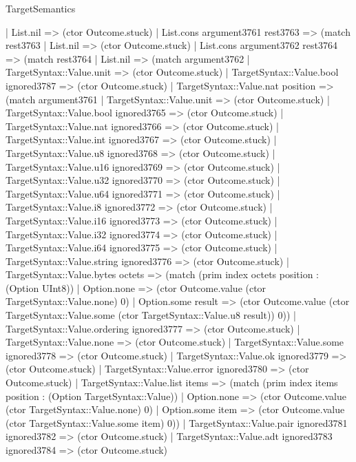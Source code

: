 \begin{lexlean}{TargetSemantics}
\begin{semanticmodule}
{      | List.nil => (ctor Outcome.stuck)
      | List.cons argument3761 rest3763 => (match rest3763
        | List.nil => (ctor Outcome.stuck)
        | List.cons argument3762 rest3764 => (match rest3764
          | List.nil => (match argument3762
            | TargetSyntax::Value.unit => (ctor Outcome.stuck)
            | TargetSyntax::Value.bool ignored3787 => (ctor Outcome.stuck)
            | TargetSyntax::Value.nat position => (match argument3761
              | TargetSyntax::Value.unit => (ctor Outcome.stuck)
              | TargetSyntax::Value.bool ignored3765 => (ctor Outcome.stuck)
              | TargetSyntax::Value.nat ignored3766 => (ctor Outcome.stuck)
              | TargetSyntax::Value.int ignored3767 => (ctor Outcome.stuck)
              | TargetSyntax::Value.u8 ignored3768 => (ctor Outcome.stuck)
              | TargetSyntax::Value.u16 ignored3769 => (ctor Outcome.stuck)
              | TargetSyntax::Value.u32 ignored3770 => (ctor Outcome.stuck)
              | TargetSyntax::Value.u64 ignored3771 => (ctor Outcome.stuck)
              | TargetSyntax::Value.i8 ignored3772 => (ctor Outcome.stuck)
              | TargetSyntax::Value.i16 ignored3773 => (ctor Outcome.stuck)
              | TargetSyntax::Value.i32 ignored3774 => (ctor Outcome.stuck)
              | TargetSyntax::Value.i64 ignored3775 => (ctor Outcome.stuck)
              | TargetSyntax::Value.string ignored3776 => (ctor Outcome.stuck)
              | TargetSyntax::Value.bytes octets => (match (prim index octets position : (Option UInt8))
                | Option.none => (ctor Outcome.value (ctor TargetSyntax::Value.none) 0)
                | Option.some result => (ctor Outcome.value (ctor TargetSyntax::Value.some (ctor TargetSyntax::Value.u8 result)) 0))
              | TargetSyntax::Value.ordering ignored3777 => (ctor Outcome.stuck)
              | TargetSyntax::Value.none => (ctor Outcome.stuck)
              | TargetSyntax::Value.some ignored3778 => (ctor Outcome.stuck)
              | TargetSyntax::Value.ok ignored3779 => (ctor Outcome.stuck)
              | TargetSyntax::Value.error ignored3780 => (ctor Outcome.stuck)
              | TargetSyntax::Value.list items => (match (prim index items position : (Option TargetSyntax::Value))
                | Option.none => (ctor Outcome.value (ctor TargetSyntax::Value.none) 0)
                | Option.some item => (ctor Outcome.value (ctor TargetSyntax::Value.some item) 0))
              | TargetSyntax::Value.pair ignored3781 ignored3782 => (ctor Outcome.stuck)
              | TargetSyntax::Value.adt ignored3783 ignored3784 => (ctor Outcome.stuck)
}
\end{semanticmodule}
\end{lexlean}
